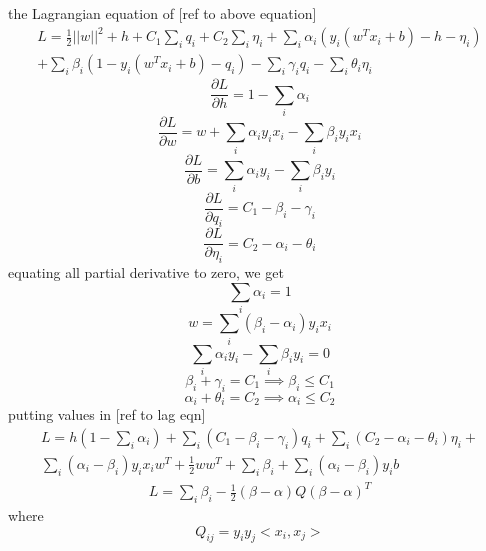 the Lagrangian equation of [ref to above equation]
\begin{equation}
\begin{split}
L = \frac{1}{2}||w||^2 + h + C_1\sum_i{q_i} + C_2\sum_i{\eta_i} + \sum_i{\alpha_i (y_i(w^Tx_i+b) - h - \eta_i)} \\
+ \sum_i{\beta_i (1 - y_i(w^Tx_i +b) - q_i)} - \sum_i{\gamma_iq_i} - \sum_i{\theta_i\eta_i}
\end{split}
\end{equation}
\begin{equation}
\frac{\partial L}{\partial h} = 1 - \sum_i{\alpha_i}
\end{equation}
\begin{equation}
\frac{\partial L}{\partial w} = w + \sum_i{\alpha_iy_ix_i} - \sum_i{\beta_iy_ix_i}
\end{equation}
\begin{equation}
\frac{\partial L}{\partial b} = \sum_i{\alpha_iy_i} - \sum_i{\beta_iy_i}
\end{equation}
\begin{equation}
\frac{\partial L}{\partial q_i} = C_1 - \beta_i - \gamma_i
\end{equation}
\begin{equation}
\frac{\partial L}{\partial \eta_i} = C_2 - \alpha_i -\theta_i
\end{equation}
equating all partial derivative to zero, we get
\begin{equation}
\sum_i{\alpha_i} = 1
\end{equation}
\begin{equation}
w = \sum_i{(\beta_i -\alpha_i)y_ix_i}
\end{equation}
\begin{equation}
\sum_i{\alpha_iy_i} - \sum_i{\beta_iy_i} = 0
\end{equation}
\begin{equation}
\beta_i + \gamma_i = C_1 \implies \beta_i \leq C_1
\end{equation}
\begin{equation}
\alpha_i +\theta_i = C_2 \implies \alpha_i \leq C_2
\end{equation}
putting values in [ref to lag eqn]
\begin{equation}
\begin{split}
L=h(1-\sum_i\alpha_i) + \sum_i{(C_1 - \beta_i - \gamma_i)q_i} + \sum_i{(C_2 - \alpha_i - \theta_i)\eta_i} +\\ \sum_i{(\alpha_i-\beta_i)y_ix_iw^T} + \frac{1}{2}ww^T + \sum_i{\beta_i} + \sum_i{(\alpha_i - \beta_i)y_ib}
\end{split}
\end{equation}
\begin{equation}
\begin{split}
L= \sum_i{\beta_i} - \frac{1}{2}(\beta - \alpha)Q(\beta - \alpha)^T
\end{split}
\end{equation}
where
\begin{equation}
Q_{ij} = y_iy_j<x_i,x_j>
\end{equation}

